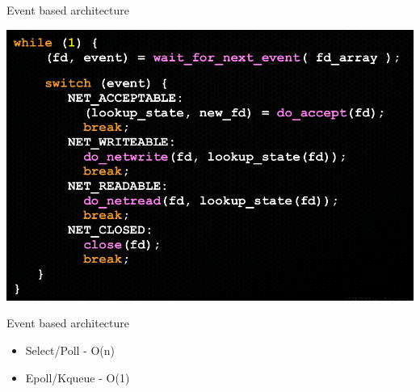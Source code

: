 \begin{frame}{Event based architecture}
  \begin{center}
    \includegraphics[width=\textwidth,keepaspectratio]{sources/images/event_based.png}
  \end{center}
\end{frame}

\begin{frame}{Event based architecture}
  \begin{center}
    \begin{itemize}
      \item Select/Poll - O(n)
      \item Epoll/Kqueue - O(1)
    \end{itemize}
  \end{center}
\end{frame}